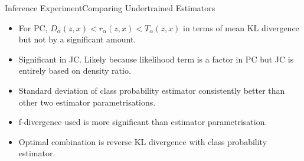 \documentclass{beamer}
\begin{document}
\begin{frame}{Inference Experiment}{Comparing Undertrained Estimators}
\begin{itemize}
\item For PC, $D_\alpha(z,x)<r_\alpha(z,x)<T_\alpha(z,x)$ in terms of mean KL divergence but not by a significant amount.
\item Significant in JC. Likely because likelihood term is a factor in PC but JC is entirely based on density ratio.
\item Standard deviation of class probability estimator consistently better than other two estimator parametrisations.
\item f-divergence used is more significant than estimator parametrisation.
\item Optimal combination is reverse KL divergence with class probability estimator.
\end{itemize}
\end{frame}
\end{document}
